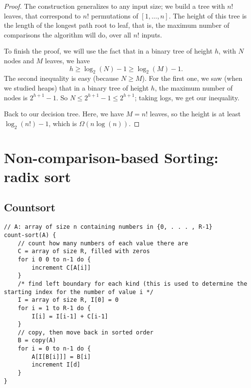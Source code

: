 \documentclass{report}
\begin{document}
\begin{proof}
The construction generalizes to any input size; we build a tree with $n!$ 
leaves, that correspond to $n!$ permutations of $[1,\dots,n]$. The height of 
this tree is the length of the longest path root to leaf, that is, the maximum
number of comparisons the algorithm will do, over all $n!$ inputs.

To finish the proof, we will use the fact that in a binary tree of
height $h$, with $N$ nodes and $M$ leaves, we have 
$$ h \ge \log_2(N)-1 \ge \log_2(M)-1.$$
The second inequality is easy (because $N \ge M$). For the first one,
we saw (when we studied heaps) that in a binary tree of height $h$, 
the maximum number of nodes is $2^{h+1}-1$. So $N \le 2^{h+1}-1 \le 2^{h+1}$;
taking logs, we get our inequality.

Back to our decision tree. Here, we have $M=n!$ leaves, so the height
is at least $\log_2(n!)-1$, which is $\Omega(n\log(n))$.
\end{proof}

\section{Non-comparison-based Sorting: radix sort}

\subsection{Countsort}

\begin{lstlisting}
// A: array of size n containing numbers in {0, . . . , R-1}
count-sort(A) {
	// count how many numbers of each value there are
	C = array of size R, filled with zeros
	for i 0 0 to n-1 do {
		increment C[A[i]]
	}
	/* find left boundary for each kind (this is used to determine the starting index for the number of value i */
	I = array of size R, I[0] = 0
	for i = 1 to R-1 do {
		I[i] = I[i-1] + C[i-1]
	}
	// copy, then move back in sorted order
	B = copy(A)
	for i = 0 to n-1 do {
		A[I[B[i]]] = B[i]
		increment I[d]
	}
}
\end{lstlisting}
\end{document}
